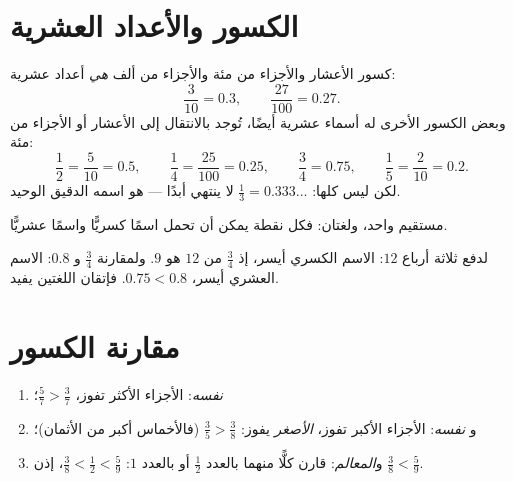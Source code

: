 \section{الكسور والأعداد العشرية}

\begin{proposition}\label{prop:g5:fractions:decimal}
كسور الأعشار والأجزاء من مئة والأجزاء من ألف \emph{هي} أعداد
عشرية:
\[
\frac{3}{10} = 0.3, \qquad \frac{27}{100} = 0.27 .
\]
وبعض الكسور الأخرى له أسماء عشرية أيضًا، تُوجد بالانتقال إلى
الأعشار أو الأجزاء من مئة:
\[
\frac{1}{2} = \frac{5}{10} = 0.5, \qquad
\frac{1}{4} = \frac{25}{100} = 0.25, \qquad
\frac{3}{4} = 0.75, \qquad
\frac{1}{5} = \frac{2}{10} = 0.2 .
\]
لكن ليس كلها:  $\frac13 = 0.333\dots$ لا ينتهي أبدًا ---
 هو اسمه الدقيق الوحيد.
\end{proposition}
\admitted

\begin{omfigure}

{\small مستقيم واحد، ولغتان: فكل نقطة يمكن أن تحمل اسمًا كسريًّا
واسمًا عشريًّا.}
\end{omfigure}

\begin{example}\label{ex:g5:fractions:choose}
لدفع ثلاثة أرباع $12$: الاسم الكسري أيسر،
إذ $\frac34$ من $12$ هو $9$. ولمقارنة $\frac34$ و $0.8$: الاسم
العشري أيسر، $0.75 < 0.8$. فإتقان اللغتين يفيد.
\end{example}

\section{مقارنة الكسور}

\begin{method}\label{met:g5:fractions:compare}
\begin{enumerate}
  \item \emph{ نفسه}: الأجزاء الأكثر تفوز،
        $\frac57 > \frac37$؛
  \item و\emph{ نفسه}: الأجزاء الأكبر تفوز، 
        \emph{الأصغر} يفوز: $\frac35 > \frac38$ (فالأخماس أكبر
        من الأثمان)؛
  \item و\emph{المعالم}: قارن كلًّا منهما بالعدد $\frac12$ أو بالعدد $1$:
        $\frac38 < \frac12 < \frac59$، إذن $\frac38 < \frac59$.
\end{enumerate}
\end{method}

